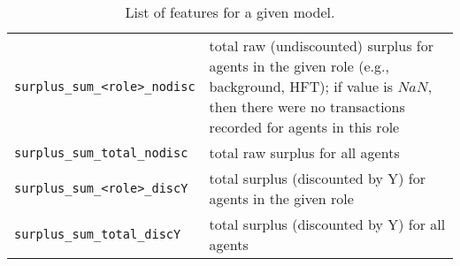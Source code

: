 \documentclass[11pt]{article}
\begin{document}
\begin{table}
\begin{tabular}[f]{p{} p{}}
\verb|surplus_sum_<role>_nodisc| & total raw (undiscounted) surplus for agents in the given role (e.g., background, HFT); if value is $NaN$, then there were no transactions recorded for agents in this role \\
\verb|surplus_sum_total_nodisc|	& total raw surplus for all agents \\
\verb|surplus_sum_<role>_discY|	& total surplus (discounted by Y) for agents in the given role \\
\verb|surplus_sum_total_discY|	& total surplus (discounted by Y) for all agents \\


\end{tabular}
\caption{List of features for a given model.}
\label{tab:obs}
\end{table}
\end{document}
